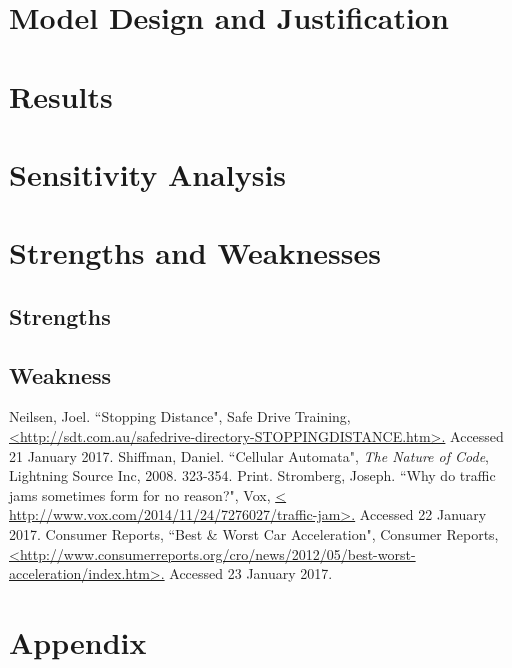 \documentclass[a4paper]{article}
\begin{document}
\section{Model Design and Justification}
\section{Results}
\section{Sensitivity Analysis}
	
\section{Strengths and Weaknesses}
	\subsection{Strengths}
	\subsection{Weakness}






	\newpage

	\begin{thebibliography}{0}
		 Neilsen, Joel. ``Stopping Distance", Safe Drive Training,  \url{<http://sdt.com.au/safedrive-directory-STOPPINGDISTANCE.htm>.} Accessed 21 January 2017.
		\bibitem{} Shiffman, Daniel. ``Cellular Automata", \textit{The Nature of Code}, Lightning Source Inc, 2008. 323-354. Print.
		 Stromberg, Joseph. ``Why do traffic jams sometimes form for no reason?", Vox, \url{< http://www.vox.com/2014/11/24/7276027/traffic-jam>.} Accessed 22 January 2017.
		 Consumer Reports, ``Best \& Worst Car Acceleration", Consumer Reports, \url{<http://www.consumerreports.org/cro/news/2012/05/best-worst-acceleration/index.htm>.} Accessed 23 January 2017.
	\end{thebibliography}








	\newpage

\section*{Appendix}
%


%


%
\end{document}
